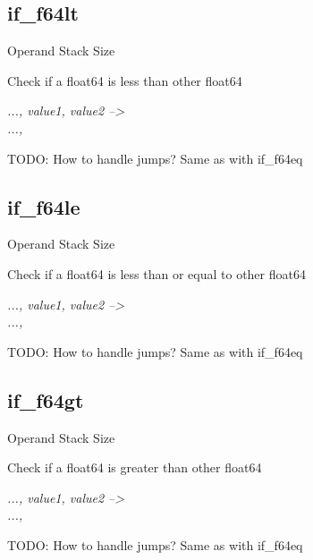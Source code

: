 \documentclass[12pt]{article}
\begin{document}
		\subsection*{if\_f64lt}
			\begin{labeling}{Operand Stack Size}
				\item [\textbf{Operation}] Check if a float64 is less than other float64
				\item [\textbf{Format}] 
				\item [\textbf{Operand Stack}] \textit{..., value1, value2 --\textgreater} \\
										\textit{..., }
				\item [\textbf{Description}] TODO: How to handle jumps? Same as with if\_f64eq
			\end{labeling}	
		\newpage
		
		\subsection*{if\_f64le}
			\begin{labeling}{Operand Stack Size}
				\item [\textbf{Operation}] Check if a float64 is less than or equal to other float64
				\item [\textbf{Format}] 
				\item [\textbf{Operand Stack}] \textit{..., value1, value2 --\textgreater} \\
										\textit{..., }
				\item [\textbf{Description}] TODO: How to handle jumps? Same as with if\_f64eq
			\end{labeling}	
		\newpage
		
		\subsection*{if\_f64gt}
			\begin{labeling}{Operand Stack Size}
				\item [\textbf{Operation}] Check if a float64 is greater than other float64
				\item [\textbf{Format}] 
				\item [\textbf{Operand Stack}] \textit{..., value1, value2 --\textgreater} \\
										\textit{..., }
				\item [\textbf{Description}] TODO: How to handle jumps? Same as with if\_f64eq
			\end{labeling}	
		\newpage
		
\end{document}
